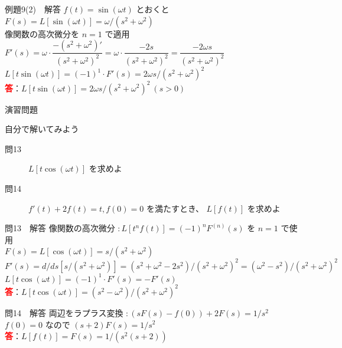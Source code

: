 \documentclass[professionalfonts]{beamer}
\begin{document}
\begin{frame}{例題9(2)　解答}
  $f(t) = \sin(\omega t)$ とおくと $F(s) = L[\sin(\omega t)] = \omega/(s^{2}+\omega^{2})$\\[4pt]
  像関数の高次微分を $n=1$ で適用\\[4pt]
  $F'(s) = \omega\cdot\dfrac{-(s^{2}+\omega^{2})'}{(s^{2}+\omega^{2})^{2}} = \omega\cdot\dfrac{-2s}{(s^{2}+\omega^{2})^{2}} = \dfrac{-2\omega s}{(s^{2}+\omega^{2})^{2}}$\\[4pt]
  $L[t\sin(\omega t)] = (-1)^{1}\cdot F'(s) = 2\omega s/(s^{2}+\omega^{2})^{2}$
  \\[8pt]\textcolor{red}{\textbf{答}}：$L[t\sin(\omega t)] = 2\omega s/(s^{2}+\omega^{2})^{2} \ (s > 0)$
\end{frame}

\begin{frame}{演習問題}
  \begin{exampleblock}{自分で解いてみよう}
  \begin{description}
    \item[問13] $L[t \cos(\omega t)]$ を求めよ
    \item[問14] $f'(t)+2f(t)=t, f(0)=0$ を満たすとき、 $L[f(t)]$ を求めよ
  \end{description}
  \end{exampleblock}
\end{frame}

\begin{frame}{問13　解答}
  像関数の高次微分 $: L[t^n f(t)] = (-1)^n F^{(n)}(s)$ を $n=1$ で使用\\[4pt]
  $F(s) = L[\cos(\omega t)] = s/(s^{2}+\omega^{2})$\\[4pt]
  $F'(s) = d/ds [s/(s^{2}+\omega^{2})] = (s^{2}+\omega^{2}-2s^{2})/(s^{2}+\omega^{2})^{2} = (\omega^{2}-s^{2})/(s^{2}+\omega^{2})^{2}$\\[4pt]
  $L[t \cos(\omega t)] = (-1)^{1}\cdot F'(s) = -F'(s)$
  \\[8pt]\textcolor{red}{\textbf{答}}：$L[t \cos(\omega t)] = (s^{2}-\omega^{2})/(s^{2}+\omega^{2})^{2}$
\end{frame}

\begin{frame}{問14　解答}
  両辺をラプラス変換 $: (sF(s)-f(0)) + 2F(s) = 1/s^{2}$\\[4pt]
  $f(0)=0$ なので $(s+2)F(s) = 1/s^{2}$
  \\[8pt]\textcolor{red}{\textbf{答}}：$L[f(t)] = F(s) = 1/(s^{2}(s+2))$
\end{frame}
\end{document}

